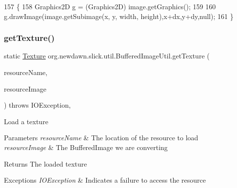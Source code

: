 \begin{DoxyCode}
157                                                                                                            
      \{
158         Graphics2D g = (Graphics2D) image.getGraphics();
159         
160         g.drawImage(image.getSubimage(x, y, width, height),x+dx,y+dy,null);
161     \}
\end{DoxyCode}
\mbox{\label{classorg_1_1newdawn_1_1slick_1_1util_1_1_buffered_image_util_a60639f0e446fa211b987096681b98615}} 
\subsubsection{\texorpdfstring{get\+Texture()}{getTexture()}\hspace{0.1cm}{\footnotesize\ttfamily [1/3]}}
{\footnotesize\ttfamily static \mbox{\hyperlink{interfaceorg_1_1newdawn_1_1slick_1_1opengl_1_1_texture}{Texture}} org.\+newdawn.\+slick.\+util.\+Buffered\+Image\+Util.\+get\+Texture (\begin{DoxyParamCaption}\item[{String}]{resource\+Name,  }\item[{Buffered\+Image}]{resource\+Image }\end{DoxyParamCaption}) throws I\+O\+Exception\hspace{0.3cm}{\ttfamily [inline]}, {\ttfamily [static]}}

Load a texture


\begin{DoxyParams}{Parameters}
{\em resource\+Name} & The location of the resource to load \\
\hline
{\em resource\+Image} & The Buffered\+Image we are converting \\
\hline
\end{DoxyParams}
\begin{DoxyReturn}{Returns}
The loaded texture 
\end{DoxyReturn}

\begin{DoxyExceptions}{Exceptions}
{\em I\+O\+Exception} & Indicates a failure to access the resource \\
\hline
\end{DoxyExceptions}

